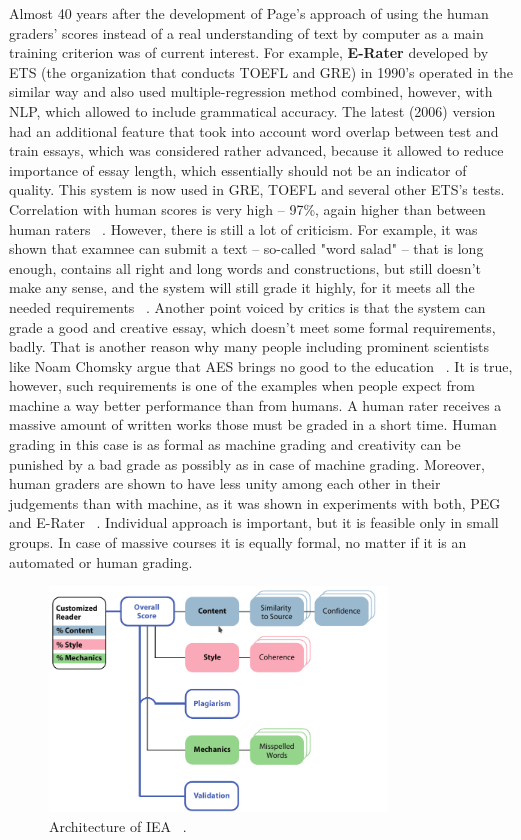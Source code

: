 Almost 40 years after the development of Page's approach of using the human graders' scores instead of a real understanding of text by computer as a main training criterion was of current interest. For example, \textbf{E-Rater} developed by ETS (the organization that conducts TOEFL and GRE) in 1990's operated in the similar way and also used multiple-regression method combined, however, with NLP, which allowed to include grammatical accuracy. The latest (2006) version had an additional feature that took into account word overlap between test and train essays, which was considered rather advanced, because it allowed to reduce importance of essay length, which essentially should not be an indicator of quality. This system is now used in GRE, TOEFL and several other ETS's tests. Correlation with human scores is very high -- 97\%, again higher than between human raters ~\cite{Blood}. However, there is still a lot of criticism. For example, it was shown that examnee can submit a text -- so-called "word salad" -- that is long enough, contains all right and long words and constructions, but still doesn't make any sense, and the system will still grade it highly, for it meets all the needed requirements ~\cite{Hearst}. Another point voiced by critics is that the system can grade a good and creative essay, which doesn't meet some formal requirements, badly. That is another reason why many people including prominent scientists like Noam Chomsky argue that AES brings no good to the education ~\cite{petition}. It is true, however, such requirements is one of the examples when people expect from machine a way better performance than from humans. A human rater receives a massive amount of written works those must be graded in a short time. Human grading in this case is as formal as machine grading and creativity can be punished by a bad grade as possibly as in case of machine grading. Moreover, human graders are shown to have less unity among each other in their judgements than with machine, as it was shown in experiments with both, PEG and E-Rater ~\cite{Blood}. Individual approach is important, but it is feasible only in small groups. In case of massive courses it is equally formal, no matter if it is an automated or human grading.\\

\begin{figure}[h!]
  \centering
  \includegraphics[width=0.8\textwidth]{img/IEAArch}
    \caption{Architecture of IEA ~\cite{Dikli}.\label{fig:IEAArch}}
\end{figure}

